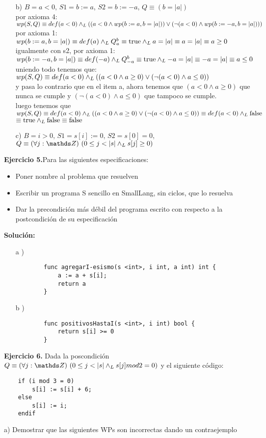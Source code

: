 \documentclass{article}
\begin{document}
\begin{enumerate}
	\item [b)] $B = a < 0$, $S1 = b := a$, $S2 = b := -a$, $Q \equiv (b = |a|)$\\
	por axioma 4: $wp(S,Q) \equiv def(a < 0) \land _L ((a < 0 \land wp(b := a, b = |a|)) \lor (\lnot (a < 0) \land wp(b := -a, b = |a|)))$\\
	por axioma 1: $wp(b := a, b = |a|) \equiv def(a) \land _L Q^{b}_{a} \equiv \mathrm{true} \land _L a = |a| \equiv a = |a| \equiv a \geq 0$\\
	igualmente con s2, por axioma 1: $wp(b := -a, b = |a|) \equiv def(-a) \land _L Q^{b}_{-a} \equiv \mathrm{true} \land _L -a = |a| \equiv -a = |a| \equiv a \leq 0$\\
	uniendo todo tenemos que: $wp(S,Q) \equiv def(a < 0) \land _L ((a < 0 \land a \geq 0) \lor (\lnot (a < 0) \land a \leq 0))$\\
	y pasa lo contrario que en el item a, ahora tenemos que $(a < 0 \land a \geq 0)$ que nunca se cumple y $(\lnot (a < 0) \land a \leq 0)$ que tampoco se cumple.\\
	luego tenemos que $wp(S,Q) \equiv def(a < 0) \land _L ((a < 0 \land a \geq 0) \lor (\lnot (a < 0) \land a \leq 0)) \equiv def(a < 0) \land _L \mathrm{false}$\\
	$\equiv \mathrm{true} \land _L \mathrm{false} \equiv \mathrm{false}$\\

	\item [c)] $B = i > 0$, $S1 = s[i] := 0$, $S2 = s[0] = 0$, $Q \equiv \paraTodo[unalinea]{j}{\ent}{0 \leq j < |s| \yLuego s[j] \geq 0}$
\end{enumerate}

\textbf{Ejercicio 5.}Para las siguientes especificaciones:
\begin{itemize}
	\item Poner nombre al problema que resuelven
	\item Escribir un programa S sencillo en SmallLang, sin ciclos, que lo resuelva
	\item Dar la precondici\'on m\'as d\'ebil del programa escrito con respecto a la postcondici\'on de su especificaci\'on
\end{itemize}
\textbf{Soluci\'on:}
\begin{itemize}
	\item [a])
	\begin{lstlisting}
		func agregarI-esismo(s <int>, i int, a int) int {
			a := a + s[i];
			return a
		}
	\end{lstlisting}
	\item [b])
	\begin{lstlisting}
		func positivosHastaI(s <int>, i int) bool {
			return s[i] >= 0
		}
	\end{lstlisting}
\end{itemize}

\textbf{Ejercicio 6.} Dada la poscondici\'on $Q \equiv \paraTodo[unalinea]{j}{\ent}{0 \leq j < |s| \yLuego s[j] mod 2 = 0}$ y el siguiente c\'odigo:
\begin{lstlisting}
	if (i mod 3 = 0)
		s[i] := s[i] + 6;
	else
		s[i] := i;
	endif
\end{lstlisting}
a) Demostrar que las siguientes WPs son incorrectas dando un contraejemplo
\end{document}
